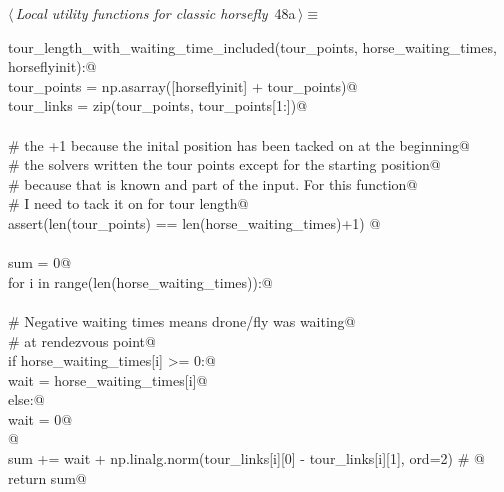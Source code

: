 \documentclass[11.5pt]{report}
\begin{document}
\begin{flushleft} \small\label{scrap60}\raggedright\small
{} $\langle\,${\itshape Local utility functions for classic horsefly}\nobreak\ {\footnotesize {48a}}$\,\rangle\equiv$
\vspace{-1ex}
\begin{list}{}{} \item
\mbox{}\verb@def tour_length_with_waiting_time_included(tour_points, horse_waiting_times, horseflyinit):@\\
\mbox{}\verb@      tour_points   = np.asarray([horseflyinit] + tour_points)@\\
\mbox{}\verb@      tour_links    = zip(tour_points, tour_points[1:])@\\
\mbox{}\verb@@\\
\mbox{}\verb@      # the +1 because the inital position has been tacked on at the beginning@\\
\mbox{}\verb@      # the solvers written the tour points except for the starting position@\\
\mbox{}\verb@      # because that is known and part of the input. For this function@\\
\mbox{}\verb@      # I need to tack it on for tour length@\\
\mbox{}\verb@      assert(len(tour_points) == len(horse_waiting_times)+1) @\\
\mbox{}\verb@@\\
\mbox{}\verb@      sum = 0@\\
\mbox{}\verb@      for i in range(len(horse_waiting_times)):@\\
\mbox{}\verb@@\\
\mbox{}\verb@          # Negative waiting times means drone/fly was waiting@\\
\mbox{}\verb@          # at rendezvous point@\\
\mbox{}\verb@          if horse_waiting_times[i] >= 0:@\\
\mbox{}\verb@              wait = horse_waiting_times[i]@\\
\mbox{}\verb@          else:@\\
\mbox{}\verb@              wait = 0@\\
\mbox{}\verb@              @\\
\mbox{}\verb@          sum += wait + np.linalg.norm(tour_links[i][0] - tour_links[i][1], ord=2) # @\\
\mbox{}\verb@      return sum@\\
\mbox{}\verb@@{\NWsep}
\end{list}

\end{flushleft}
\end{document}
